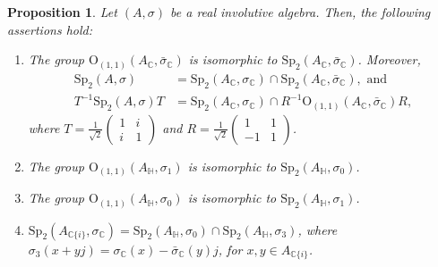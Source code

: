\documentclass[10pt,a4paper]{amsart}
\newtheorem{prop}{Proposition}
\begin{document}
\begin{prop}\label{prop:incarn}
    Let $(A,\sigma)$ be a real involutive algebra. Then, the following assertions hold:
    \begin{enumerate}    
        \item The group $\mathrm{O}_{(1,1)}(A_\mathbb C,\bar\sigma_\mathbb C)$ is isomorphic to 
        $\mathrm{Sp}_{2}(A_\mathbb C,\bar\sigma_\mathbb C)$. Moreover,
        \begin{align*}
        \mathrm{Sp}_2(A,\sigma)&=\mathrm{Sp}_{2}(A_\mathbb C,\sigma_\mathbb C)\cap \mathrm{Sp}_{2}(A_\mathbb C,\bar\sigma_\mathbb C), \text{ and }\\
         T^{-1}\mathrm{Sp}_2(A,\sigma)T&=\mathrm{Sp}_{2}(A_\mathbb C,\sigma_\mathbb C)\cap R^{-1}\mathrm{O}_{(1,1)}(A_\mathbb C,\bar\sigma_\mathbb C)R,
        \end{align*}
        where $T=\frac{1}{\sqrt{2}}\begin{pmatrix}
        1 & i \\
        i & 1 \end{pmatrix}$ and $R=\frac{1}{\sqrt{2}}\begin{pmatrix}
        1 & 1 \\
        -1 & 1 \end{pmatrix}$.
        \item The group $\mathrm{O}_{(1,1)}(A_\mathbb H,\sigma_1)$ is isomorphic to $\mathrm{Sp}_{2}(A_\mathbb H,\sigma_0)$.
        \item The group $\mathrm{O}_{(1,1)}(A_\mathbb H,\sigma_0)$ is isomorphic to $\mathrm{Sp}_{2}(A_\mathbb H,\sigma_1)$.
        \item $\mathrm{Sp}_{2}(A_{\mathbb C\{i\}},\sigma_\mathbb C)=\mathrm{Sp}_{2}(A_\mathbb H,\sigma_0)\cap \mathrm{Sp}_{2}(A_\mathbb H,\sigma_3)$, where $\sigma_3(x+yj)={\sigma}_{\mathbb{C}}(x)-\bar{\sigma}_{\mathbb{C}}(y)j$, for $x,y\in A_{\mathbb C\{i\}}$.    
    \end{enumerate}
\end{prop}
\end{document}
